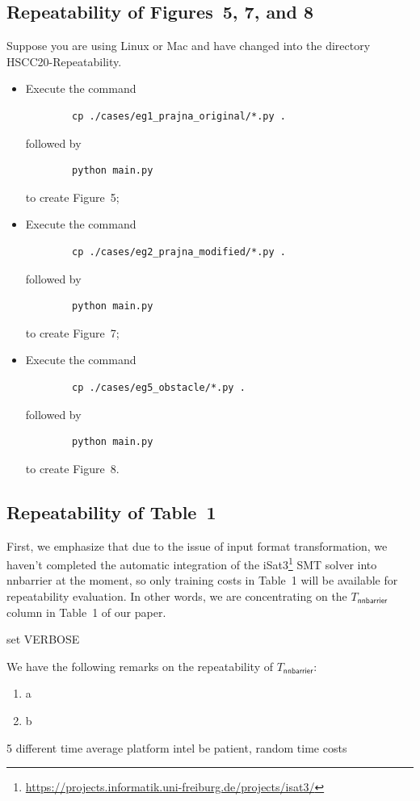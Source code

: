 \documentclass{llncs}
\begin{document}
\subsection{Repeatability of Figures~5, 7, and 8}
Suppose you are using Linux or Mac and have changed into the directory \textsf{HSCC20-Repeatability}. 
\begin{itemize}
\item Execute the command
\begin{verbatim}              
        cp ./cases/eg1_prajna_original/*.py .
\end{verbatim}
followed by 
\begin{verbatim}              
        python main.py
\end{verbatim}
to create Figure~5;
\item Execute the command
\begin{verbatim}              
        cp ./cases/eg2_prajna_modified/*.py .
\end{verbatim}
followed by 
\begin{verbatim}              
        python main.py
\end{verbatim}
to create Figure~7;
\item Execute the command
\begin{verbatim}              
        cp ./cases/eg5_obstacle/*.py .
\end{verbatim}
followed by 
\begin{verbatim}              
        python main.py
\end{verbatim}
to create Figure~8.
\end{itemize}

\subsection{Repeatability of Table~1}
First, we emphasize that due to the issue of input format transformation, we haven't completed the automatic integration of the \textsf{iSat3}\footnote{\url{https://projects.informatik.uni-freiburg.de/projects/isat3/}}
SMT solver into \textsf{nnbarrier} at the moment, so only training costs in Table~1 will be available for repeatability evaluation. In other words, we are concentrating on the $T_{\textsf{nnbarrier}}$ column in Table~1 of our paper.

set VERBOSE

We have the following remarks on the repeatability of $T_{\textsf{nnbarrier}}$:
\begin{enumerate}
    \item a
    \item b
\end{enumerate}
5 different time average
platform intel
be patient, random time costs
\end{document}

